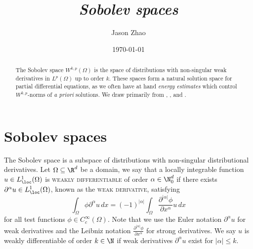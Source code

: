 \documentclass[reqno]{amsart}
\title
{
	\emph{Sobolev spaces}
}
\author{Jason Zhao}
\date{\today}
\theoremstyle{definition}
\theoremstyle{remark}
\renewcommand{\emph}{\textsc}
\begin{document}
\maketitle

\begin{abstract}
	The Sobolev space $W^{k, p} (\Omega)$ is the space of distributions with non-singular weak derivatives in $L^p (\Omega)$ up to order $k$. These spaces form a natural solution space for partial differential equations, as we often have at hand \textit{energy estimates} which control $W^{k, p}$-norms of \textit{a priori} solutions. We draw primarily from \cite{Evans2022}, \cite{EvansGariepy2015}, and \cite{Oh222}.
\end{abstract}

\tableofcontents
	

\section{Sobolev spaces}

The Sobolev space is a subspace of distributions with non-singular distributional derivatives. Let $\Omega \subseteq \R^d$ be a domain, we say that a locally integrable function $u \in L^1_\loc (\Omega)$ is \emph{weakly differentiable} of order $\alpha \in \N_0^d$ if there exists $\partial^\alpha u \in L^1_\loc (\Omega)$, known as the \emph{weak derivative}, satisfying
	\[ \int_\Omega \phi \partial^\alpha u \, dx = (-1)^{|\alpha|}\int_\Omega \frac{\partial^{|\alpha|} \phi}{\partial x^\alpha} u \, dx  \]
for all test functions $\phi \in C^\infty_c (\Omega)$. Note that we use the Euler notation $\partial^\alpha u$ for weak derivatives and the Leibniz notation $\tfrac{\partial^{|\alpha|}\phi}{\partial x^\alpha}$ for strong derivatives. We say $u$ is weakly differentiable of order $k \in \N$ if weak derivatives $\partial^\alpha u$ exist for $|\alpha| \leq k$. 
\end{document}
